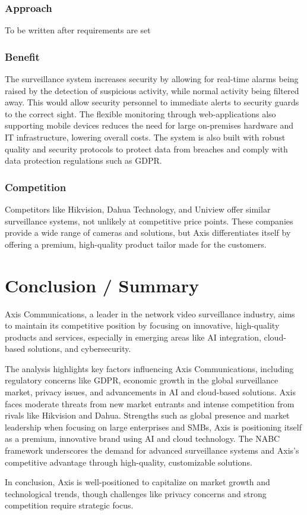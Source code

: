 \documentclass{article}
\begin{document}
\subsubsection{Approach}
To be written after requirements are set

\subsubsection{Benefit}
The surveillance system increases security by allowing for real-time alarms being raised by the detection of suspicious activity, while normal activity being filtered away. This would allow security personnel to immediate alerts to security guards to the correct sight. The flexible monitoring through web-applications also supporting mobile devices reduces the need for large on-premises hardware and IT infrastructure, lowering overall costs. The system is also built with robust quality and security protocols to protect data from breaches and comply with data protection regulations such as GDPR.

\subsubsection{Competition}
Competitors like Hikvision, Dahua Technology, and Uniview offer similar surveillance systems, not unlikely at competitive price points. These companies provide a wide range of cameras and solutions, but Axis differentiates itself by offering a premium, high-quality product tailor made for the customers. 

\newpage
\section{Conclusion / Summary}
Axis Communications, a leader in the network video surveillance industry, aims to maintain its competitive position by focusing on innovative, high-quality products and services, especially in emerging areas like AI integration, cloud-based solutions, and cybersecurity.

The analysis highlights key factors influencing Axis Communications, including regulatory concerns like GDPR, economic growth in the global surveillance market, privacy issues, and advancements in AI and cloud-based solutions. Axis faces moderate threats from new market entrants and intense competition from rivals like Hikvision and Dahua. Strengths such as global presence and market leadership when focusing on large enterprises and SMBs, Axis is positioning itself as a premium, innovative brand using AI and cloud technology. The NABC framework underscores the demand for advanced surveillance systems and Axis’s competitive advantage through high-quality, customizable solutions.

In conclusion, Axis is well-positioned to capitalize on market growth and technological trends, though challenges like privacy concerns and strong competition require strategic focus.


\newpage
\printbibliography
\end{document}
